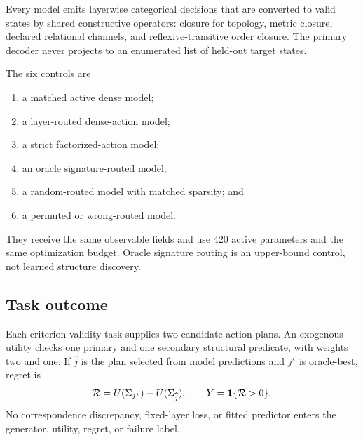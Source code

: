 Every model emits layerwise categorical decisions that are converted to valid
states by shared constructive operators: closure for topology, metric closure,
declared relational channels, and reflexive-transitive order closure.  The
primary decoder never projects to an enumerated list of held-out target states.

The six controls are
\begin{enumerate}[label=(\arabic*)]
    \item a matched active dense model;
    \item a layer-routed dense-action model;
    \item a strict factorized-action model;
    \item an oracle signature-routed model;
    \item a random-routed model with matched sparsity; and
    \item a permuted or wrong-routed model.
\end{enumerate}
They receive the same observable fields and use \(420\) active parameters and
the same optimization budget.  Oracle signature routing is an upper-bound
control, not learned structure discovery.

\subsection{Task outcome}

Each criterion-validity task supplies two candidate action plans.  An
exogenous utility checks one primary and one secondary structural predicate,
with weights two and one.  If \(\widehat j\) is the plan selected from model
predictions and \(j^\star\) is oracle-best, regret is
\[
\mathcal R
=
U(\Sigma_{j^\star})-U(\Sigma_{\widehat j}),
\qquad
Y=\mathbf 1\{\mathcal R>0\}.
\]
No correspondence discrepancy, fixed-layer loss, or fitted predictor enters
the generator, utility, regret, or failure label.
